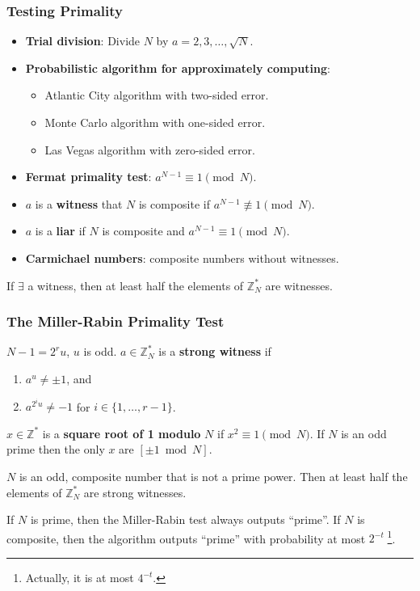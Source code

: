 \begin{frame}\frametitle{Testing Primality}
\begin{itemize}
\item \textbf{Trial division}: Divide $N$ by $a=2,3,\dotsc,\sqrt{N}.$
\item \textbf{Probabilistic algorithm for approximately computing}:
\begin{itemize}
\item Atlantic City algorithm with two-sided error. 
\item Monte Carlo algorithm with one-sided error.
\item Las Vegas algorithm with zero-sided error.
\end{itemize}
\item \textbf{Fermat primality test}: $a^{N-1} \equiv 1 \pmod N$.
\item $a$ is a \textbf{witness} that $N$ is composite if $a^{N-1} \not \equiv 1 \pmod N$.
\item $a$ is a \textbf{liar} if $N$ is composite and $a^{N-1} \equiv 1 \pmod N$.
\item \textbf{Carmichael numbers}: composite numbers without witnesses.
\end{itemize}
\begin{theorem}
If $\exists$ a witness, then at least half the elements of $\mathbb{Z}_N^*$ are witnesses.
\end{theorem}
\end{frame}
\begin{frame}\frametitle{The Miller-Rabin Primality Test}
$N-1=2^ru$, $u$ is odd. $a \in \mathbb{Z}^*_N$ is a \textbf{strong witness} if
\begin{enumerate}
\item $a^u \neq \pm 1$, and
\item $a^{2^iu} \neq -1$ for $i\in\{1,\dotsc,r-1\}$.
\end{enumerate}
\begin{lemma}
$x \in \mathbb{Z}^*$ is a \textbf{square root of 1 modulo} $N$ if $x^2 \equiv 1 \pmod N$. If $N$ is an odd prime then the only $x$ are $[\pm 1 \bmod N]$.
\end{lemma}
\begin{theorem}
$N$ is an odd, composite number that is not a prime power. Then at least half the elements of $\mathbb{Z}^*_N$ are strong witnesses.
\end{theorem}
\begin{theorem}
If $N$ is prime, then the Miller-Rabin test always outputs ``prime''. If $N$ is composite, then the algorithm outputs ``prime'' with probability at most $2^{-t}\;$\footnote{Actually, it is at most $4^{-t}$.}.
\end{theorem}
\end{frame}
